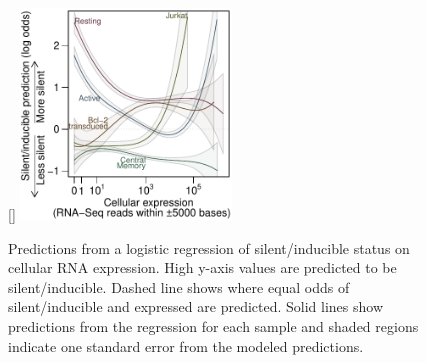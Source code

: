 \documentclass[../sherrill-Mix_thesis.tex]{subfiles}
\begin{document}
	\begin{figure}
		\centering
			[\FBwidth]{
				\includegraphics[width=0.5\textwidth]{rnaGlm.pdf} %
			}{
				\caption[Cellular expression and latency]{Predictions from a logistic regression of silent/inducible status on cellular RNA expression. High y-axis values are predicted to be silent/inducible. Dashed line shows where equal odds of silent/inducible and expressed are predicted. Solid lines show predictions from the regression for each sample and shaded regions indicate one standard error from the modeled predictions.}
				\label{rnaGlm}
			}
	\end{figure}
\end{document}
